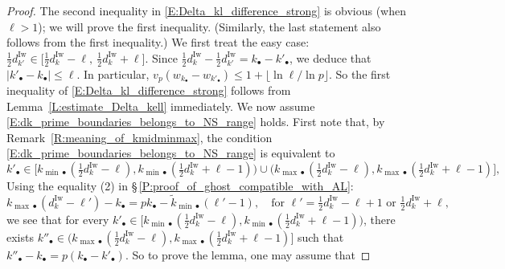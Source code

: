 \begin{proof}
    The second inequality in \eqref{E:Delta_kl_difference_strong} is obvious (when $\ell >1$); we will prove the first inequality. (Similarly, the last statement also follows from the first inequality.)
    We first treat the easy case: $\frac 12d_{k'}^{\mathrm{Iw}}\in \big[\frac 12d_k^{\mathrm{Iw}}-\ell, \ \frac 12d_k^{\mathrm{Iw}}+\ell\big]$.
    Since $\frac 12 d_{k}^{\mathrm{Iw}}- \frac 12 d_{k'}^{\mathrm{Iw}}= k_\bullet - k'_\bullet$, we deduce that $|k'_\bullet - k_\bullet|\leq \ell$. In particular, $v_p(w_{k_\bullet}-w_{k'_\bullet}) \leq 1+ \big\lfloor \ln \ell / \ln p\big\rfloor$. So the first inequality of \eqref{E:Delta_kl_difference_strong} follows from Lemma~\ref{L:estimate_Delta_kell} immediately.
    We now assume \eqref{E:dk_prime_boundaries_belongs_to_NS_range} holds.  First note that, by Remark~\ref{R:meaning_of_kmidminmax}, the condition \eqref{E:dk_prime_boundaries_belongs_to_NS_range} is equivalent to
    \begin{equation}
    \label{E:k_prime_so_that_dk_primeunr_in_Steinberg}
    k'_\bullet \in \big[k_{{\min}\bullet}(\tfrac 12 d_{k}^{\mathrm{Iw}}- \ell), k_{{\min}\bullet}(\tfrac 12 d_{k}^{\mathrm{Iw}}+ \ell-1) \big) \cup \big(k_{{\max}\bullet}(\tfrac 12 d_{k}^{\mathrm{Iw}}- \ell), k_{{\max}\bullet}(\tfrac 12 d_{k}^{\mathrm{Iw}}+ \ell-1) \big],
    \end{equation}
    Using the equality (2) in \S\,\ref{P:proof_of_ghost_compatible_with_AL}:
    \begin{equation}
    \label{E:near_Steinberg_duality}
    k_{{\max}\bullet}(d_{k}^{\mathrm{Iw}}- \ell') - k_\bullet= pk_\bullet - \tilde k_{{\min}\bullet}(\ell' -1 ), \quad \textrm{for }\ell'  = \tfrac 12 d_{k}^{\mathrm{Iw}}- \ell+1 \textrm{ or } \tfrac 12 d_{k}^{\mathrm{Iw}}+\ell,
    \end{equation}
    we see that for every $k'_\bullet \in \big[k_{{\min}\bullet}(\tfrac 12 d_{k}^{\mathrm{Iw}}- \ell), k_{{\min}\bullet}(\tfrac 12 d_{k}^{\mathrm{Iw}}+ \ell-1) \big)$, there exists $k''_\bullet \in \big(k_{{\max}\bullet}(\tfrac 12 d_{k}^{\mathrm{Iw}}- \ell), k_{{\max}\bullet}(\tfrac 12 d_{k}^{\mathrm{Iw}}+ \ell-1) \big]$ such that
    $
    k''_\bullet -k_\bullet = p(k_\bullet  -k'_\bullet).
    $
    So to prove the lemma, one may assume that

\end{proof}

